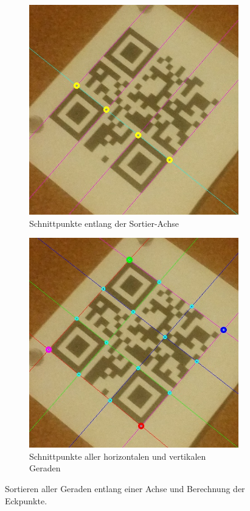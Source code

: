 \begin{figure}[h]
\centering
\begin{subfigure}[t]{0.48\textwidth}
\centering
\includegraphics[scale=0.25]{images/qrcode-adler-wand_7___SORT___0_.jpg}
\caption{Schnittpunkte entlang der Sortier-Achse}\label{fig:sort}
\end{subfigure}%
\begin{subfigure}[t]{0.48\textwidth}
\centering
\includegraphics[scale=0.25]{images/qrcode-adler-wand_9___INTERSECTIONS___0_.jpg}
\caption{Schnittpunkte aller horizontalen und vertikalen Geraden}
\end{subfigure}
\caption{Sortieren aller Geraden entlang einer Achse und Berechnung der Eckpunkte.}
\end{figure}

